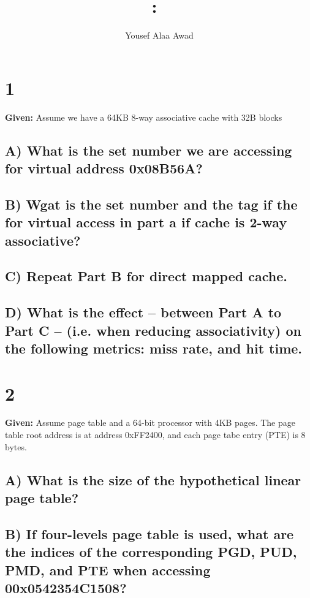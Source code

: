 \documentclass{article}
\title{
    \vspace{2in}
    \textmd{\textbf{\hmwkClass:\ \hmwkTitle}}\\
    \normalsize\vspace{0.1in}
    \vspace{3in}
}
\author{Yousef Alaa Awad}
\begin{document}
\maketitle
\pagebreak

\section{1}
\textbf{Given:} Assume we have a 64KB 8-way associative cache with 32B blocks

\subsection{A) What is the set number we are accessing for virtual address 0x08B56A?}


\subsection{B) Wgat is the set number and the tag if the for virtual access in part a if cache is 2-way associative?}

\subsection{C) Repeat Part B for direct mapped cache.}

\subsection{D) What is the effect -- between Part A to Part C -- (i.e. when reducing associativity) on the following metrics: miss rate, and hit time.}


\section{2}
\textbf{Given:} Assume page table and a 64-bit processor with 4KB pages. The page table root address is at address 0xFF2400, and each page tabe entry (PTE) is 8 bytes.

\subsection{A) What is the size of the hypothetical linear page table?}

\subsection{B) If four-levels page table is used, what are the indices of the corresponding PGD, PUD, PMD, and PTE when accessing 00x0542354C1508?}
\end{document}
